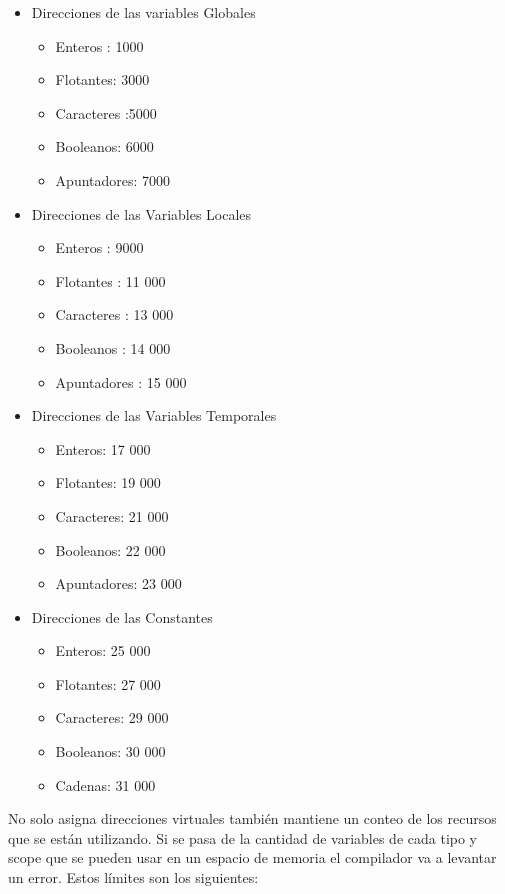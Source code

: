 \begin{itemize}
    \item Direcciones de las variables Globales \begin{itemize}
        \item Enteros : 1000
        \item Flotantes: 3000
        \item Caracteres :5000
        \item Booleanos: 6000
        \item Apuntadores: 7000
    \end{itemize}
    
    \item Direcciones de las Variables Locales \begin{itemize}
        \item Enteros : 9000
        \item Flotantes : 11 000
        \item Caracteres : 13 000
        \item Booleanos : 14 000
        \item Apuntadores : 15 000
    \end{itemize}
    
    \item Direcciones de las Variables Temporales \begin{itemize}
        \item Enteros: 17 000
        \item Flotantes: 19 000
        \item Caracteres: 21 000
        \item Booleanos: 22 000
        \item Apuntadores:  23 000
    \end{itemize}
    
    \item Direcciones de las Constantes \begin{itemize}
        \item Enteros: 25 000
        \item Flotantes: 27 000
        \item Caracteres: 29 000
        \item Booleanos: 30 000
        \item Cadenas:  31 000
    \end{itemize}
\end{itemize}

No solo asigna direcciones virtuales también mantiene un conteo de los recursos que se están utilizando. Si se pasa de la cantidad de variables de cada tipo y scope que se pueden usar en un espacio de memoria el compilador va a levantar un error. Estos límites son los siguientes:

